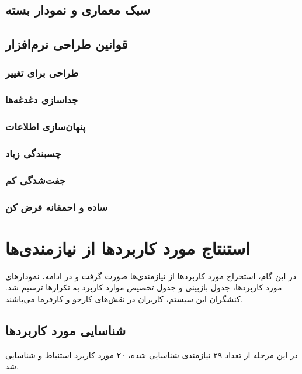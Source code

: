 \documentclass[12pt,svgnames,oneside]{book}
\begin{document}
		\section{سبک‌ معماری و نمودار بسته}
		\section{قوانین طراحی نرم‌افزار}
			\subsection{طراحی برای تغییر}
			\subsection{جداسازی دغدغه‌ها}
			\subsection{پنهان‌سازی اطلاعات}
			\subsection{چسبندگی زیاد}
			\subsection{جفت‌شدگی کم}
			\subsection{ساده و احمقانه فرض کن}
			
	\chapter{استنتاج مورد کاربرد‌ها از نیازمندی‌‌ها}
		در این گام، استخراج مورد کاربرد‌ها از نیازمندی‌ها صورت گرفت و در ادامه، نمودار‌‌های مورد کاربرد‌ها، جدول بازبینی و جدول تخصیص موارد کاربرد به تکرار‌‌ها ترسیم شد. کنشگران این سیستم، کاربران در نقش‌های کارجو و کارفرما می‌باشند.
		
		\section{شناسایی مورد کاربرد‌ها}
			در این مرحله از تعداد ۲۹ نیازمندی شناسایی شده، ۲۰ مورد کاربرد استنباط و شناسایی شد.
\end{document}
